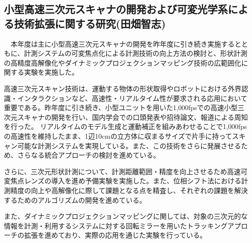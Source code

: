 \subsection{小型高速三次元スキャナの開発および可変光学系による技術拡張に関する研究(田畑智志)}

　本年度は主に小型高速三次元スキャナの開発を昨年度に引き続き実施するとともに、計測システムの可変焦点化による計測技術の向上方法の検討と、形状計測の高精度高解像化やダイナミックプロジェクションマッピング技術の広範囲化に関する実験を実施した。

高速三次元スキャン技術は、運動する物体の形状取得やロボットにおける外界認識・インタラクションなど、高速性・リアルタイム性が要求される応用において重要である。昨年度に引き続き、小型ユニットを用いた1,000fpsでの高速小型三次元スキャナの開発を行い、国内学会での口頭発表や招待論文、報道による周知を行った。
リアルタイムのモデル生成と運動補正を組みあわせることで1,000fpsの高速性を維持したまま、1辺10cmの立方体に収まるサイズで片手に持ってスキャン可能な計測システムを実現している。また、この技術をさらに発展させるため、さらなる統合アプローチの検討を進めている。

さらに、三次元形状計測について、計測距離範囲・精度を向上させるため高速可変焦点レンズの導入を進め予備実験を実施した。また、位相シフト法における計測精度の向上や高解像化に際して課題となる点を精査し、それぞれの課題を解決するためのアルゴリズムの開発を進めている。

また、ダイナミックプロジェクションマッピングに関しては、対象の三次元的な情報を計測・利用するシステムに対する回転ミラーを用いたトラッキングアプローチの拡張を進めており、実際の応用を通じた実験を行っている。


